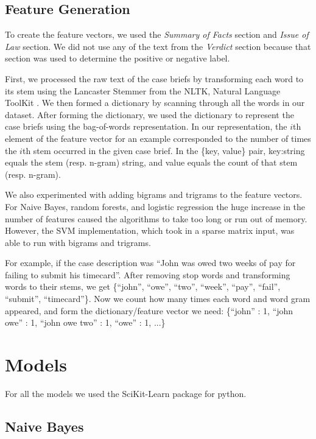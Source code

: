 \documentclass[journal]{IEEEtran}
\begin{document}
\subsection{Feature Generation}

To create the feature vectors, we used the \textit{Summary of Facts} section and \textit{Issue of Law} section. We did not use any of the text from the \textit{Verdict} section because that section was used to determine the positive or negative label.

First, we processed the raw text of the case briefs by transforming each word to its stem using the Lancaster Stemmer from the NLTK, Natural Language ToolKit \cite{Loper:2002:NNL:1118108.1118117}. We then formed a dictionary by scanning through all the words in our dataset. After forming the dictionary, we used the dictionary to represent the case briefs using the bag-of-words representation. In our representation, the $i$th element of the feature vector for an example corresponded to the number of times the $i$th stem occurred in the given case brief. In the \{key, value\} pair, key:string equals the stem (resp. n-gram) string, and value equals the count of that stem (resp. n-gram).

We also experimented with adding bigrams and trigrams to the feature vectors. For Naive Bayes, random forests, and logistic regression the huge increase in the number of features caused the algorithms to take too long or run out of memory. However, the SVM implementation, which took in a sparse matrix input, was able to run with bigrams and trigrams.

For example, if the case description was ``John was owed two weeks of pay for failing to submit his timecard''. After removing stop words and transforming words to their stems, we get \{``john'', ``owe'', ``two'', ``week'', ``pay'', ``fail'', ``submit'', ``timecard''\}. Now we count how many times each word and word gram appeared, and form the dictionary/feature vector we need: \{``john'' : 1, ``john owe'' : 1, ``john owe two'' : 1, ``owe'' : 1, ...\}

\section{Models}

For all the models we used the SciKit-Learn package \cite{scikit-learn} for python.

\subsection{Naive Bayes}
\end{document}
